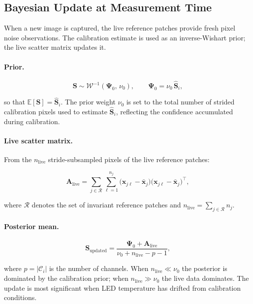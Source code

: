 \documentclass[11pt, a4paper]{article}
\newcommand{\E}{\mathbb{E}}
\newcommand{\bx}{\mathbf{x}}
\newcommand{\bS}{\mathbf{S}}
\newcommand{\bA}{\mathbf{A}}
\newcommand{\bPsi}{\boldsymbol{\Psi}}
\begin{document}
\subsection{Bayesian Update at Measurement Time}

When a new image is captured, the live reference patches provide
fresh pixel noise observations.  The calibration estimate is used as
an inverse-Wishart prior; the live scatter matrix updates it.

\paragraph{Prior.}
\begin{equation}
  \bS \sim \mathcal{W}^{-1}(\bPsi_0,\,\nu_0),
  \qquad
  \bPsi_0 = \nu_0\,\hat{\bS}_i,
  \label{eq:iw-prior}
\end{equation}

so that $\E[\bS] = \hat{\bS}_i$.
The prior weight $\nu_0$ is set to the total number of strided
calibration pixels used to estimate $\hat{\bS}_i$, reflecting the
confidence accumulated during calibration.

\paragraph{Live scatter matrix.}
From the $n_{\mathrm{live}}$ stride-subsampled pixels of the live
reference patches:

\begin{equation}
  \bA_{\mathrm{live}}
    = \sum_{j \in \mathcal{R}}\sum_{\ell=1}^{n_j}
        \bigl(\mathbf{x}_{j\ell} - \bar{\bx}_j\bigr)
        \bigl(\mathbf{x}_{j\ell} - \bar{\bx}_j\bigr)^{\!\top},
  \label{eq:live-scatter}
\end{equation}

where $\mathcal{R}$ denotes the set of invariant reference patches
and $n_{\mathrm{live}} = \sum_{j \in \mathcal{R}} n_j$.

\paragraph{Posterior mean.}
\begin{equation}
  \bS_{\mathrm{updated}}
    = \frac{\bPsi_0 + \bA_{\mathrm{live}}}
           {\nu_0 + n_{\mathrm{live}} - p - 1},
  \label{eq:iw-posterior}
\end{equation}

where $p = |\mathcal{C}_i|$ is the number of channels.
When $n_{\mathrm{live}} \ll \nu_0$ the posterior is dominated by the
calibration prior; when $n_{\mathrm{live}} \gg \nu_0$ the live data
dominates.  The update is most significant when LED temperature has
drifted from calibration conditions.
\end{document}
